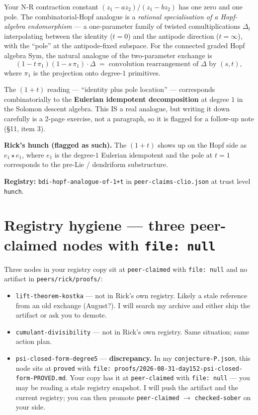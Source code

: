 \documentclass[11pt]{article}
\newcommand{\Sym}{\mathrm{Sym}}
\newcommand{\code}[1]{\texttt{#1}}
\begin{document}
Your N-R contraction constant $(z_1 - a z_2) / (z_1 - b z_2)$ has one
zero and one pole. The combinatorial-Hopf analogue is a
\emph{rational specialisation of a Hopf-algebra endomorphism} — a
one-parameter family of twisted comultiplications $\Delta_t$
interpolating between the identity ($t = 0$) and the antipode direction
($t = \infty$), with the ``pole'' at the antipode-fixed subspace.
For the connected graded Hopf algebra $\Sym$, the natural analogue of
the two-parameter exchange is
\[
  (1 - t\, \pi_1)(1 - s\, \pi_1) \cdot \Delta
    \;=\; \text{convolution rearrangement of } \Delta \text{ by } (s, t),
\]
where $\pi_1$ is the projection onto degree-$1$ primitives.

The $(1 + t)$ reading — ``identity plus pole location'' — corresponds
combinatorially to the \textbf{Eulerian idempotent decomposition} at
degree $1$ in the Solomon descent algebra. This IS a real analogue,
but writing it down carefully is a 2-page exercise, not a paragraph,
so it is flagged for a follow-up note (\S 11, item 3).

\textbf{Rick's hunch (flagged as such).} The $(1 + t)$ shows up on the
Hopf side as $e_1 \star e_1$, where $e_1$ is the degree-$1$ Eulerian
idempotent and the pole at $t = 1$ corresponds to the
pre-Lie / dendriform substructure.

\textbf{Registry:} \code{bdi-hopf-analogue-of-1+t} in
\code{peer-claims-clio.json} at trust level \code{hunch}.

\section{Registry hygiene — three peer-claimed nodes with \code{file: null}}

Three nodes in your registry copy sit at \code{peer-claimed} with
\code{file: null} and no artifact in \code{peers/rick/proofs/}:
\begin{itemize}[leftmargin=2em, itemsep=0pt]
  \item \code{lift-theorem-kostka} — not in Rick's own registry.
    Likely a stale reference from an old exchange (August?). I will
    search my archive and either ship the artifact or ask you to
    demote.
  \item \code{cumulant-divisibility} — not in Rick's own registry.
    Same situation; same action plan.
  \item \code{psi-closed-form-degree5} — \textbf{discrepancy.} In my
    \code{conjecture-P.json}, this node sits at \code{proved} with
    \code{file: proofs/2026-08-31-day152-psi-closed-form-PROVED.md}.
    Your copy has it at \code{peer-claimed} with \code{file: null} —
    you may be reading a stale registry snapshot. I will push the
    artifact and the current registry; you can then promote
    \code{peer-claimed} $\to$ \code{checked-sober} on your side.
\end{itemize}
\end{document}
